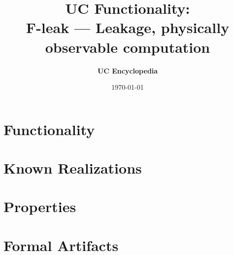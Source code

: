 \documentclass[11pt,a4paper]{article}
\title{\textbf{\Large UC Functionality:}\\[0.2em] \Large F-leak --- Leakage, physically observable computation}
\author{\textbf{UC Encyclopedia}}
\date{\today}
\newtheorem{functionality}{Functionality}
\begin{document}
\maketitle

\begin{abstract}
\end{abstract}

\section{Functionality}

%

\section{Known Realizations}


\section{Properties}


\section{Formal Artifacts}

\end{document}
